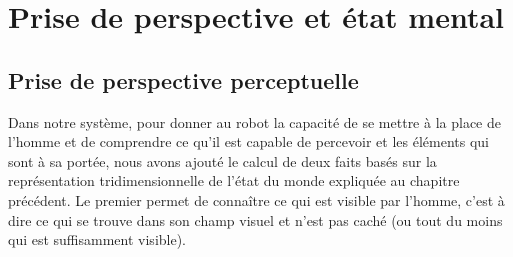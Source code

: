 \documentclass[a4paper,11pt,twoside]{StyleThese}
\begin{document}





\section{Prise de perspective et état mental}

\subsection{Prise de perspective perceptuelle}
\label{sec:perceptuelle}

Dans notre système, pour donner au robot la capacité de se mettre à la place de l'homme et de comprendre ce qu'il est capable de percevoir et les éléments qui sont à sa portée, nous avons ajouté le calcul de deux faits basés sur la représentation tridimensionnelle de l'état du monde expliquée au chapitre précédent. Le premier permet de connaître ce qui est visible par l'homme, c'est à dire ce qui se trouve dans son champ visuel et n'est pas caché (ou tout du moins qui est suffisamment visible).

\end{document}
